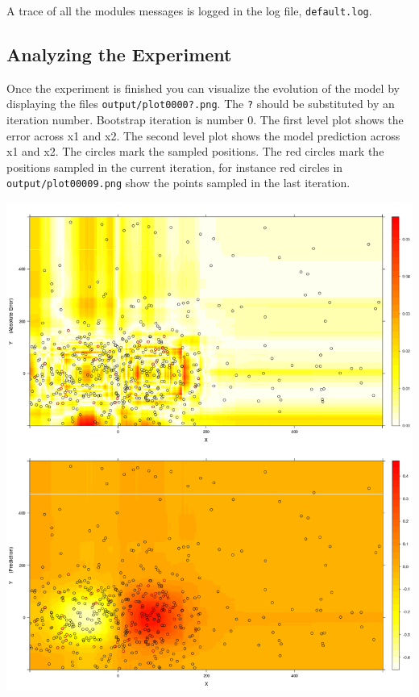 A trace of all the modules messages is logged in the log file, \texttt{default.log}.

\subsection{Analyzing the Experiment}

Once the experiment is finished you can visualize the evolution of the model by displaying the files \texttt{output/plot0000?.png}.
The \texttt{?} should be substituted by an iteration number. Bootstrap iteration is number 0.
The first level plot shows the error across x1 and x2. The second level plot shows the model prediction across x1 and x2.
The circles mark the sampled positions. The red circles mark the positions sampled in the current iteration, for instance red circles
in \texttt{output/plot00009.png} show the points sampled in the last iteration.

\begin{center}
  \includegraphics[width=\textwidth]{figures/ASK-gauss-levelplot.png}
\end{center}



